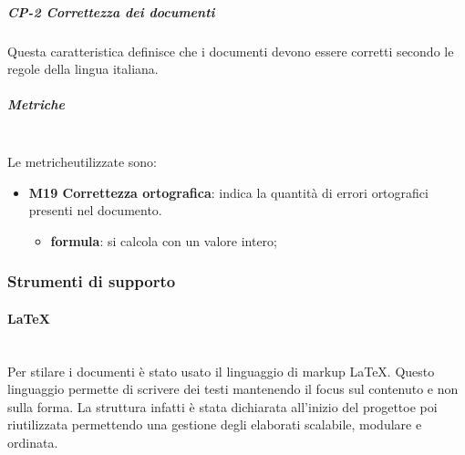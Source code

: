 		          \subparagraph{CP-2 Correttezza dei documenti}
		          Questa caratteristica definisce che i documenti devono essere corretti secondo le regole della lingua italiana.
		          \subparagraph{Metriche}\mbox{}\\ [1mm]
		          Le metriche\glosp utilizzate sono:   
		          \begin{itemize}
		          	  \item \textbf{M19 Correttezza ortografica}: indica la quantità di errori ortografici presenti nel documento.
		          	  \begin{itemize}
		          	  	\item[] \textbf{formula}: si calcola con un valore intero;
		          	  \end{itemize}
   		          \end{itemize}
        \subsubsection{Strumenti di supporto}
            \paragraph{\LaTeX}\mbox{}\\ [1mm]
                Per stilare i documenti è stato usato il linguaggio di markup \LaTeX \xspace. Questo linguaggio permette di scrivere dei testi mantenendo il focus
                sul contenuto e non sulla forma. La struttura infatti è stata dichiarata all'inizio del progetto\glosp e poi riutilizzata permettendo una gestione degli elaborati scalabile, modulare e ordinata.
